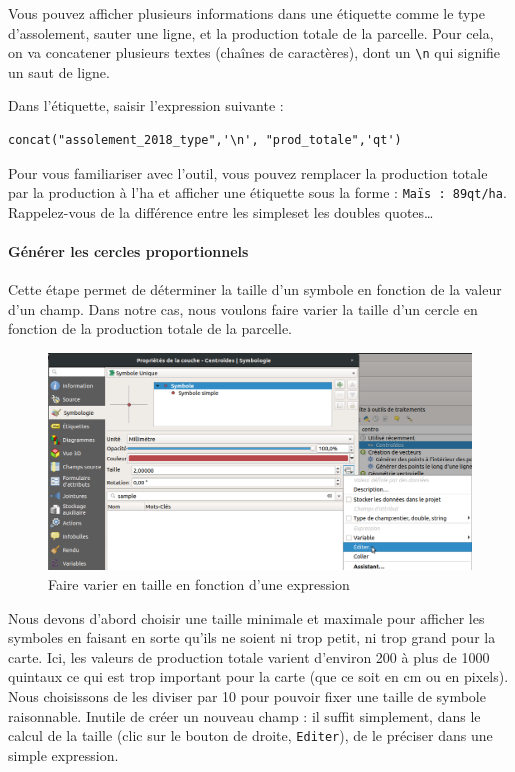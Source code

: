 Vous pouvez afficher plusieurs informations dans une étiquette comme le
type d'assolement, sauter une ligne, et la production totale de la
parcelle. Pour cela, on va concatener plusieurs textes (chaînes de
caractères), dont un \texttt{\textbackslash{}n} qui signifie un saut de
ligne.

Dans l'étiquette, saisir l'expression suivante :

\begin{verbatim}
concat("assolement_2018_type",'\n', "prod_totale",'qt')
\end{verbatim}

Pour vous familiariser avec l'outil, vous pouvez remplacer la production
totale par la production à l'ha et afficher une étiquette sous la forme
: \texttt{Maïs\ :\ 89qt/ha}. Rappelez-vous de la différence entre les
simpleset les doubles quotes\ldots{}

\paragraph{Générer les cercles
proportionnels}\label{guxe9nuxe9rer-les-cercles-proportionnels}

Cette étape permet de déterminer la taille d'un symbole en fonction de
la valeur d'un champ. Dans notre cas, nous voulons faire varier la
taille d'un cercle en fonction de la production totale de la parcelle.

\begin{figure}[htbp]
\centering
\includegraphics{figures/taille_fonction_champ.png}
\caption{Faire varier en taille en fonction d'une expression}
\end{figure}

Nous devons d'abord choisir une taille minimale et maximale pour
afficher les symboles en faisant en sorte qu'ils ne soient ni trop
petit, ni trop grand pour la carte. Ici, les valeurs de production
totale varient d'environ 200 à plus de 1000 quintaux ce qui est trop
important pour la carte (que ce soit en cm ou en pixels). Nous
choisissons de les diviser par 10 pour pouvoir fixer une taille de
symbole raisonnable. Inutile de créer un nouveau champ : il suffit
simplement, dans le calcul de la taille (clic sur le bouton de droite,
\texttt{Editer}), de le préciser dans une simple expression.

